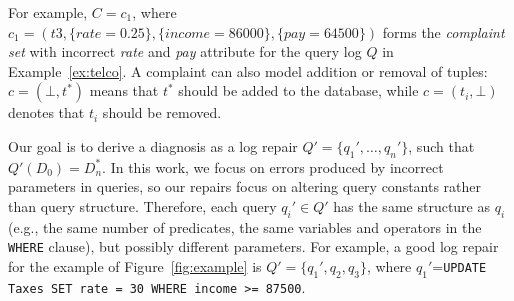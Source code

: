 For example, $C = {c_1}$, where 
$c_1 = (t3, \{rate = 0.25\}, \{income = 86000\}, \{pay = 64500\})$ 
forms the \textit{complaint set} with incorrect \textit{rate} and \textit{pay} attribute 
for the query log $Q$ in Example~\ref{ex:telco}. A complaint 
can also model addition or removal of tuples: 
$c = (\bot, t^*)$ means that $t^*$ should be added to the database, 
while $c = (t_i, \bot)$ denotes that $t_i$ should be removed.

Our goal is to derive a diagnosis as a log repair
$Q'=\{q_1',\dots, q_n'\}$, such that
$Q'(D_0)=D_n^* $. In this work, we focus on errors produced
by incorrect parameters in queries, so our repairs focus on altering
query constants rather than query structure. Therefore, each query
$q_i'\in Q'$ has the same structure as $q_i$
(e.g., the same number of predicates, the same variables and operators 
in the \texttt{WHERE} clause), 
but possibly different parameters. For example, a good log repair for the
example of Figure~\ref{fig:example} is
$Q'=\{q_1',q_2,q_3\}$, where $q_1'$=\texttt{UPDATE Taxes
SET rate = 30 WHERE income >= 87500}.